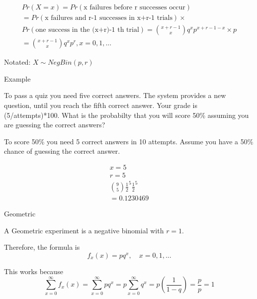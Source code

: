 \documentclass{report}
\begin{document}
\begin{description}
\begin{mdframed}
            \begin{gather}
                Pr(X=x) = Pr(\textrm{x failures before r successes occur})\\ 
                = Pr(\textrm{x failures and r-1 successes in x+r-1 trials})\times\\
                Pr(\textrm{one success in the (x+r)-1 th trial})
                = \binom{x+r-1}{x}q^x p^{x+r-1-x}\times p\\
                = \binom{x+r-1}{x}q^x p^r, x = 0,1, ...
            \end{gather}

            Notated: $X \sim NegBin(p, r)$
        \end{mdframed}
    \item {\large Example}
        \begin{mdframed}
            To pass a quiz you need five correct answers. The
            system provides a new question, until you reach the fifth
            correct answer. Your grade is (5/attempts)*100. What is
            the probabilty that you will score 50\% assuming you
            are guessing the correct answers?

            To score 50\% you need 5 correct answers in 10 attempts.
            Assume you have a 50\% chance of guessing the correct answer.

            \begin{gather}
                x=5\\ 
                r=5\\
                \binom{9}{5} \frac{1}{2}^5 \frac{1}{2}^5\\
                = 0.1230469
            \end{gather}
        \end{mdframed}
    \item {\large Geometric}
        \begin{mdframed}
            A Geometric experiment is a negative binomial
            with $r = 1$.

            Therefore, the formula is
             \begin{displaymath}
                f_x(x) = pq^x, \quad x = 0,1, ...
            \end{displaymath}

            This works because
            \begin{displaymath}
                \sum_{x=0}^{\infty}f_x(x) =
                \sum_{x=0}^{\infty}pq^x =
                p \sum_{x=0}^{\infty} q^x =
                p(\frac{1}{1-q}) =
                \frac{p}{p} = 1
            \end{displaymath}


\end{mdframed}
\end{description}
\end{document}
